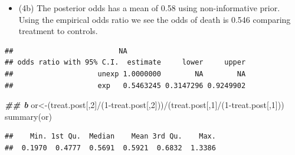 \documentclass[
]{book}
\newenvironment{Shaded}{\begin{snugshade}}{\end{snugshade}}
\newcommand{\AttributeTok}[1]{\textcolor[rgb]{0.77,0.63,0.00}{#1}}
\newcommand{\DecValTok}[1]{\textcolor[rgb]{0.00,0.00,0.81}{#1}}
\newcommand{\DocumentationTok}[1]{\textcolor[rgb]{0.56,0.35,0.01}{\textbf{\textit{#1}}}}
\newcommand{\FunctionTok}[1]{\textcolor[rgb]{0.00,0.00,0.00}{#1}}
\newcommand{\NormalTok}[1]{#1}
\newcommand{\OtherTok}[1]{\textcolor[rgb]{0.56,0.35,0.01}{#1}}
\newcommand{\SpecialCharTok}[1]{\textcolor[rgb]{0.00,0.00,0.00}{#1}}
\newcommand{\StringTok}[1]{\textcolor[rgb]{0.31,0.60,0.02}{#1}}
\providecommand{\tightlist}{%
  \setlength{\itemsep}{0pt}\setlength{\parskip}{0pt}}
\theoremstyle{definition}
\theoremstyle{definition}
\theoremstyle{definition}
\theoremstyle{definition}
\theoremstyle{remark}
\begin{document}
\begin{itemize}
\tightlist
\item
  (4b) The posterior odds has a mean of 0.58 using non-informative prior. Using the empirical odds ratio we see the odds of death is 0.546 comparing treatment to controls.
\end{itemize}

\begin{Shaded}
\end{Shaded}

\begin{verbatim}
##                         NA
## odds ratio with 95% C.I.  estimate     lower     upper
##                    unexp 1.0000000        NA        NA
##                    exp   0.5463245 0.3147296 0.9249902
\end{verbatim}

\begin{Shaded}
\begin{Highlighting}[]
  \DocumentationTok{\#\# b}
\NormalTok{  or}\OtherTok{\textless{}{-}}\NormalTok{(treat.post[,}\DecValTok{2}\NormalTok{]}\SpecialCharTok{/}\NormalTok{(}\DecValTok{1}\SpecialCharTok{{-}}\NormalTok{treat.post[,}\DecValTok{2}\NormalTok{]))}\SpecialCharTok{/}\NormalTok{(treat.post[,}\DecValTok{1}\NormalTok{]}\SpecialCharTok{/}\NormalTok{(}\DecValTok{1}\SpecialCharTok{{-}}\NormalTok{treat.post[,}\DecValTok{1}\NormalTok{]))}
\FunctionTok{summary}\NormalTok{(or)}
\end{Highlighting}
\end{Shaded}

\begin{verbatim}
##    Min. 1st Qu.  Median    Mean 3rd Qu.    Max. 
##  0.1970  0.4777  0.5691  0.5921  0.6832  1.3386
\end{verbatim}
\end{document}
